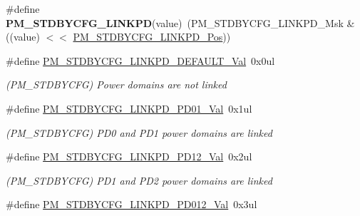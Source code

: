 \begin{DoxyCompactItemize}
\item 
\hypertarget{group___s_a_m_l21___p_m_gae897aee84f6bc340449ea586ed39e427}{}\#define {\bfseries P\+M\+\_\+\+S\+T\+D\+B\+Y\+C\+F\+G\+\_\+\+L\+I\+N\+K\+P\+D}(value)~(P\+M\+\_\+\+S\+T\+D\+B\+Y\+C\+F\+G\+\_\+\+L\+I\+N\+K\+P\+D\+\_\+\+Msk \& ((value) $<$$<$ \hyperlink{group___s_a_m_l21___p_m_ga08472f29227e219ca4aad41678bc52b1}{P\+M\+\_\+\+S\+T\+D\+B\+Y\+C\+F\+G\+\_\+\+L\+I\+N\+K\+P\+D\+\_\+\+Pos}))\label{group___s_a_m_l21___p_m_gae897aee84f6bc340449ea586ed39e427}

\item 
\hypertarget{group___s_a_m_l21___p_m_gabcd3ab08b953984c7484070dbb7f7f90}{}\#define \hyperlink{group___s_a_m_l21___p_m_gabcd3ab08b953984c7484070dbb7f7f90}{P\+M\+\_\+\+S\+T\+D\+B\+Y\+C\+F\+G\+\_\+\+L\+I\+N\+K\+P\+D\+\_\+\+D\+E\+F\+A\+U\+L\+T\+\_\+\+Val}~0x0ul\label{group___s_a_m_l21___p_m_gabcd3ab08b953984c7484070dbb7f7f90}

\begin{DoxyCompactList}\small\item\em (P\+M\+\_\+\+S\+T\+D\+B\+Y\+C\+F\+G) Power domains are not linked \end{DoxyCompactList}\item 
\hypertarget{group___s_a_m_l21___p_m_ga7f572694931cb3df5b6c6bb814a3fb10}{}\#define \hyperlink{group___s_a_m_l21___p_m_ga7f572694931cb3df5b6c6bb814a3fb10}{P\+M\+\_\+\+S\+T\+D\+B\+Y\+C\+F\+G\+\_\+\+L\+I\+N\+K\+P\+D\+\_\+\+P\+D01\+\_\+\+Val}~0x1ul\label{group___s_a_m_l21___p_m_ga7f572694931cb3df5b6c6bb814a3fb10}

\begin{DoxyCompactList}\small\item\em (P\+M\+\_\+\+S\+T\+D\+B\+Y\+C\+F\+G) P\+D0 and P\+D1 power domains are linked \end{DoxyCompactList}\item 
\hypertarget{group___s_a_m_l21___p_m_ga8a2ce283c39f41958f69265f6d3d8aa0}{}\#define \hyperlink{group___s_a_m_l21___p_m_ga8a2ce283c39f41958f69265f6d3d8aa0}{P\+M\+\_\+\+S\+T\+D\+B\+Y\+C\+F\+G\+\_\+\+L\+I\+N\+K\+P\+D\+\_\+\+P\+D12\+\_\+\+Val}~0x2ul\label{group___s_a_m_l21___p_m_ga8a2ce283c39f41958f69265f6d3d8aa0}

\begin{DoxyCompactList}\small\item\em (P\+M\+\_\+\+S\+T\+D\+B\+Y\+C\+F\+G) P\+D1 and P\+D2 power domains are linked \end{DoxyCompactList}\item 
\hypertarget{group___s_a_m_l21___p_m_ga48339ccac33fea85f5c1d254d7d370c7}{}\#define \hyperlink{group___s_a_m_l21___p_m_ga48339ccac33fea85f5c1d254d7d370c7}{P\+M\+\_\+\+S\+T\+D\+B\+Y\+C\+F\+G\+\_\+\+L\+I\+N\+K\+P\+D\+\_\+\+P\+D012\+\_\+\+Val}~0x3ul\label{group___s_a_m_l21___p_m_ga48339ccac33fea85f5c1d254d7d370c7}


\end{DoxyCompactItemize}
